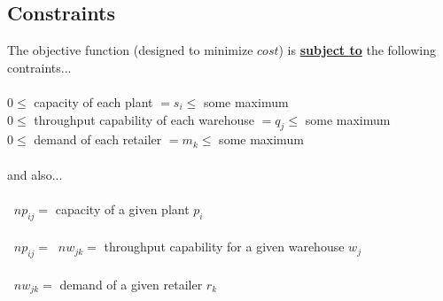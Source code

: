 \documentclass[../report/main.tex]{subfiles}
\begin{document}
\subsection*{Constraints}
The objective function (designed to minimize $cost$) is \textbf{\underline{subject to}} the following contraints...\\\\\indent $0 \leq $ capacity of each plant $= s_i \leq$ some maximum\\\indent $0 \leq $ throughput capability of each warehouse $ = q_j \leq$ some maximum\\\indent $0 \leq $ demand of each retailer  $ = m_k \leq$ some maximum\\\\and also...\\\\\indent $\mathop{\sum_{i=1}^{n}}np_{ij} = $ capacity of a given plant $p_i$\\\\\indent $\mathop{\sum_{i=1}^{n}}np_{ij} = \mathop{\sum_{k=1}^{m}}nw_{jk}= $ throughput capability for a given warehouse $w_j$\\\\\indent $\mathop{\sum_{k=1}^{m}}nw_{jk} = $ demand of a given retailer $r_k$
\end{document}
